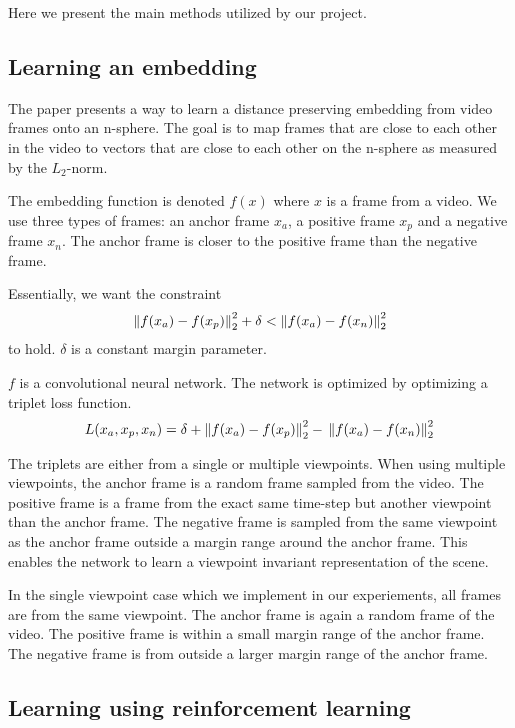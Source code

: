 
Here we present the main methods utilized by our project.

\subsection{Learning an embedding}

The paper \cite{self-supervised-learning} presents a way to learn a distance preserving embedding from video frames onto an n-sphere. The goal is to map frames that are close to each other in the video to vectors that are close to each other on the n-sphere as measured by the $L_2$-norm.

The embedding function is denoted $f(x)$ where $x$ is a frame from a video. We use three types of frames: an anchor frame $x_a$, a positive frame $x_p$ and a negative frame $x_n$. The anchor frame is closer to the positive frame than the negative frame.

Essentially, we want the constraint \[
    \left\lVert f(x_a) - f(x_p)\right\rVert^2_2 + \delta < \left\lVert f(x_a) - f(x_n)\right\rVert^2_2
    \] to hold. $\delta$ is a constant margin parameter.

$f$ is a convolutional neural network. The network is optimized by optimizing a triplet loss function. \[
    L(x_a, x_p, x_n) = \delta + \left\lVert f(x_a) - f(x_p)\right\rVert^2_2 - \\
    \left\lVert f(x_a) - f(x_n)\right\rVert^2_2
    \]

The triplets are either from a single or multiple viewpoints. When using multiple viewpoints, the anchor frame is a random frame sampled from the video. The positive frame is a frame from the exact same time-step but another viewpoint than the anchor frame. The negative frame is sampled from the same viewpoint as the anchor frame outside a margin range around the anchor frame. This enables the network to learn a viewpoint invariant representation of the scene. \citep{self-supervised-learning}

In the single viewpoint case which we implement in our experiements, all frames are from the same viewpoint. The anchor frame is again a random frame of the video. The positive frame is within a small margin range of the anchor frame. The negative frame is from outside a larger margin range of the anchor frame. \citep{self-supervised-learning}

\subsection{Learning using reinforcement learning}

